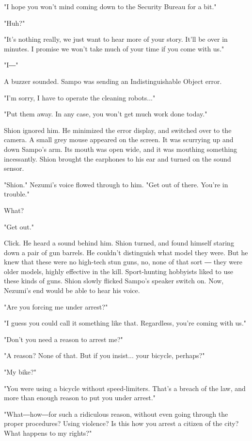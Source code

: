 "I hope you won't mind coming down to the Security Bureau for a bit."

"Huh?"

"It's nothing really, we just want to hear more of your story. It'll be
over in minutes. I promise we won't take much of your time if you come
with us."

"I―"

A buzzer sounded. Sampo was sending an Indistinguishable Object error.

"I'm sorry, I have to operate the cleaning robots..."

"Put them away. In any case, you won't get much work done today."

Shion ignored him. He minimized the error display, and switched over to
the camera. A small grey mouse appeared on the screen. It was scurrying
up and down Sampo's arm. Its mouth was open wide, and it was mouthing
something incessantly. Shion brought the earphones to his ear and turned
on the sound sensor.

"Shion." Nezumi's voice flowed through to him. "Get out of there. You're
in trouble."

What?

"Get out."

Click. He heard a sound behind him. Shion turned, and found himself
staring down a pair of gun barrels. He couldn't distinguish what model
they were. But he knew that these were no high-tech stun guns, no, none
of that sort ― they were older models, highly effective in the kill.
Sport-hunting hobbyists liked to use these kinds of guns. Shion slowly
flicked Sampo's speaker switch on. Now, Nezumi's end would be able to
hear his voice.

"Are you forcing me under arrest?"

"I guess you could call it something like that. Regardless, you're
coming with us."

"Don't you need a reason to arrest me?"

"A reason? None of that. But if you insist... your bicycle, perhaps?"

"My bike?"

"You were using a bicycle without speed-limiters. That's a breach of the
law, and more than enough reason to put you under arrest."

"What―how―for such a ridiculous reason, without even going through the
proper procedures? Using violence? Is this how you arrest a citizen of
the city? What happens to my rights?"

